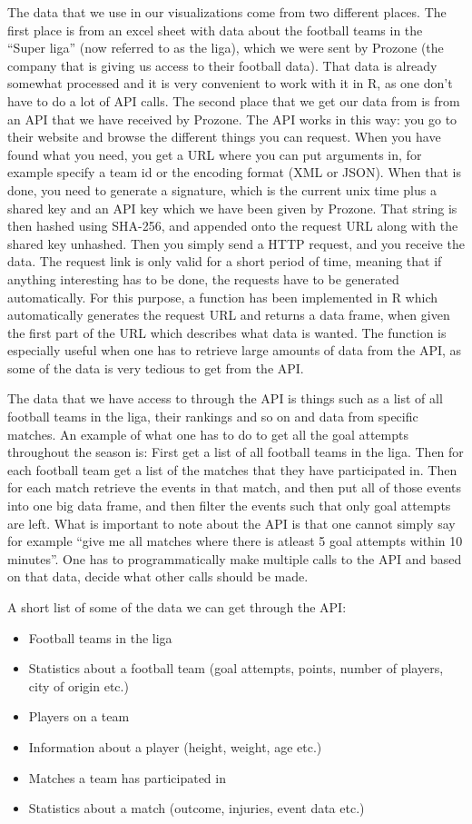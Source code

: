 \documentclass[Report.tex]{subfiles}
\begin{document}
The data that we use in our visualizations come from two different places. The first place is from an excel sheet with data about the football teams in the ``Super liga'' (now referred to as the liga), which we were sent by Prozone (the company that is giving us access to their football data). That data is already somewhat processed and it is very convenient to work with it in R, as one don't have to do a lot of API calls. The second place that we get our data from is from an API that we have received by Prozone. The API works in this way: you go to their website and browse the different things you can request. When you have found what you need, you get a URL where you can put arguments in, for example specify a team id or the encoding format (XML or JSON). When that is done, you need to generate a signature, which is the current unix time plus a shared key and an API key which we have been given by Prozone. That string is then hashed using SHA-256, and appended onto the request URL along with the shared key unhashed. Then you simply send a HTTP request, and you receive the data. The request link is only valid for a short period of time, meaning that if anything interesting has to be done, the requests have to be generated automatically. For this purpose, a function has been implemented in R which automatically generates the request URL and returns a data frame, when given the first part of the URL which describes what data is wanted. The function is especially useful when one has to retrieve large amounts of data from the API, as some of the data is very tedious to get from the API. 

The data that we have access to through the API is things such as a list of all football teams in the liga, their rankings and so on and data from specific matches. An example of what one has to do to get all the goal attempts throughout the season is: First get a list of all football teams in the liga. Then for each football team get a list of the matches that they have participated in. Then for each match retrieve the events in that match, and then put all of those events into one big data frame, and then filter the events such that only goal attempts are left. What is important to note about the API is that one cannot simply say for example ``give me all matches where there is atleast 5 goal attempts within 10 minutes''. One has to programmatically make multiple calls to the API and based on that data, decide what other calls should be made.

A short list of some of the data we can get through the API:
\begin{itemize}
\item Football teams in the liga
\item Statistics about a football team (goal attempts, points, number of players, city of origin etc.)
\item Players on a team
\item Information about a player (height, weight, age etc.)
\item Matches a team has participated in
\item Statistics about a match (outcome, injuries, event data etc.)
\end{itemize}
\end{document}

